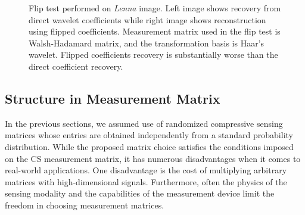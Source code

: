 \documentclass[journal]{IEEEtran}
\begin{document}
%
\begin{figure}
	\centering
	
	
	\caption{Flip test performed on \textit{Lenna} image. Left image shows recovery from direct wavelet coefficients while right image shows reconstruction using flipped coefficients. Measurement matrix used in the flip test is Walsh-Hadamard matrix, and the transformation basis is Haar's wavelet. Flipped coefficients recovery is substantially worse than the direct coefficient recovery.}
	
	\label{fig:flip_test_reconstruction}
\end{figure}

\subsection{Structure in Measurement Matrix}
In the previous sections, we assumed use of randomized compressive sensing matrices whose entries are obtained independently from a standard probability distribution. While the proposed matrix choice satisfies the conditions imposed on the CS measurement matrix, it has numerous disadvantages when it comes to real-world applications. One disadvantage is the cost of multiplying arbitrary matrices with high-dimensional signals. Furthermore, often the physics of the sensing modality and the capabilities of the measurement device limit the freedom in choosing measurement matrices. 
\end{document}
